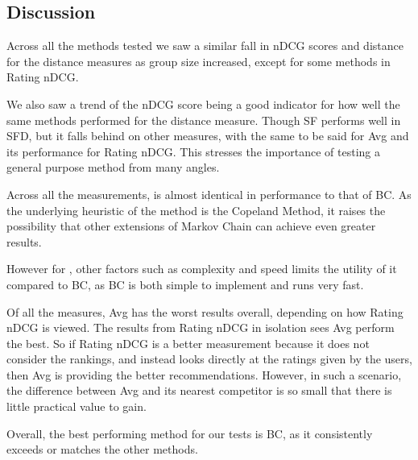 \subsection{Discussion} \label{sec:discussion}

Across all the methods tested we saw a similar fall in nDCG scores and distance for the distance measures as group size increased, except for some methods in Rating nDCG.

We also saw a trend of the nDCG score being a good indicator for how well the same  methods performed for the distance measure. Though SF performs well in SFD, but it falls behind on other measures, with the same to be said for Avg and its performance for Rating nDCG. This stresses the importance of testing a general purpose method from many angles.

Across all the measurements, \MC is almost identical in performance to that of BC. As the underlying heuristic of the \MC method is the Copeland Method, it raises the possibility that other extensions of Markov Chain can achieve even greater results.

However for \MC, other factors such as complexity and speed limits the utility of it compared to BC, as BC is both simple to implement and runs very fast.

Of all the measures, Avg has the worst results overall, depending on how Rating nDCG is viewed. The results from Rating nDCG in isolation sees Avg perform the best. So if Rating nDCG is a better measurement because it does not consider the rankings, and instead looks directly at the ratings given by the users, then Avg is providing the better recommendations. However, in such a scenario, the difference between Avg and its nearest competitor is so small that there is little practical value to gain.

Overall, the best performing method for our tests is BC, as it consistently exceeds or matches the other methods.






